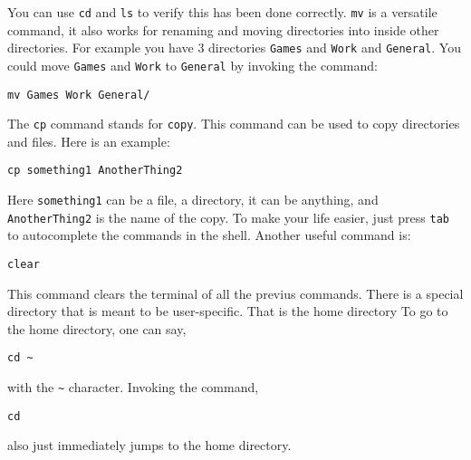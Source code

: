 \documentclass[a4paper, 12pt]{report}
\begin{document}
\begin{center}
You can use \texttt{cd} and \texttt{ls} to verify this has been done correctly. \texttt{mv} is a versatile command, it also works for renaming and moving directories into inside other directories. For example you have $3$ directories \texttt{Games} and \texttt{Work} and \texttt{General}. You could move \texttt{Games} and \texttt{Work} to \texttt{General} by invoking the command:
\begin{lstlisting}
mv Games Work General/
\end{lstlisting}
The \texttt{cp} command stands for \texttt{copy}. This command can be used to copy directories and files. Here is an example:
\begin{lstlisting}
cp something1 AnotherThing2
\end{lstlisting}
Here \texttt{something1} can be a file, a directory, it can be anything, and \texttt{AnotherThing2} is the name of the copy. To make your life easier, just press \texttt{tab} to autocomplete the commands in the shell. Another useful command is:
\begin{lstlisting}
clear
\end{lstlisting}
This command clears the terminal of all the previus commands. There is a special directory that is meant to be user-specific. That is the home directory To go to the home directory, one can say,
\begin{lstlisting}
cd ~
\end{lstlisting}
with the \texttt{\~} character. Invoking the command,
\begin{lstlisting}
cd
\end{lstlisting}
also just immediately jumps to the home directory.


\end{center}
\end{document}
